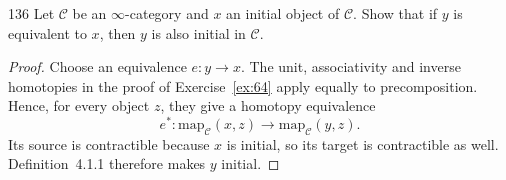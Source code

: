 \begin{exercise}{136}
Let $\mathcal C$ be an $\infty$-category and $x$ an initial object of $\mathcal C$. Show that if $y$ is
equivalent to $x$, then $y$ is also initial in $\mathcal C$.

\begin{proof}
Choose an equivalence $e\colon y\to x$.
The unit, associativity and inverse homotopies in the proof of
Exercise~\ref{ex:64} apply equally to precomposition. Hence, for every
object $z$, they give a homotopy equivalence
\[
 e^*\colon\mathrm{map}_{\mathcal C}(x,z)
 \longrightarrow\mathrm{map}_{\mathcal C}(y,z).
\]
Its source is contractible because $x$ is initial, so its target is
contractible as well. Definition~4.1.1 therefore makes $y$ initial.
\end{proof}
\end{exercise}
